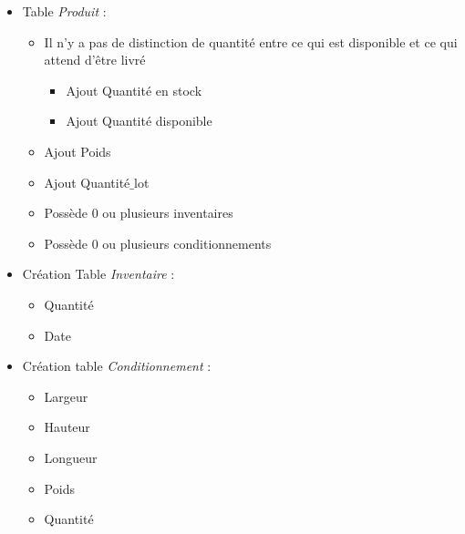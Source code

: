 \begin{itemize}[label=\textbullet, font=\LARGE \color{listGreen}]	


\item Table \textit{Produit} : 

	\begin{itemize}[label=\textbullet, font=\LARGE \color{listGrey}]	
		\item Il n’y a pas de distinction de quantité entre ce qui est disponible et ce qui attend d’être livré 

		\begin{itemize}[label=\textbullet, font=\LARGE\color{listLightGrey}]
			\item Ajout Quantité en stock 

	   		\item Ajout Quantité disponible 
		\end{itemize}


	\item Ajout Poids 

	\item Ajout Quantité$\_$lot 

	\item Possède 0 ou plusieurs inventaires 

	\item Possède 0 ou plusieurs conditionnements 
	\end{itemize}


\item Création Table \textit{Inventaire} : 

	\begin{itemize}[label=\textbullet, font=\LARGE \color{listGrey}]
		\item Quantité  

		\item Date 
	\end{itemize}


\item Création table \textit{Conditionnement} :  

	\begin{itemize}[label=\textbullet, font=\LARGE \color{listGrey}]
		\item Largeur 

		\item Hauteur 

		\item Longueur 

		\item Poids 

		\item Quantité 
	\end{itemize}



\end{itemize}
